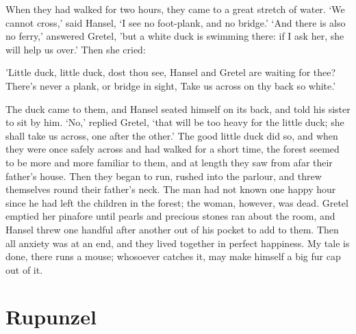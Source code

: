 \documentclass[oneside,11pt]{book} %
\begin{document}
When they had walked for two hours, they came to a great stretch of water. `We cannot cross,' said Hansel, `I see no foot-plank, and no bridge.' `And there is also no ferry,' answered Gretel, 'but a white
duck is swimming there: if I ask her, she will help us over.' Then she cried:

'Little duck, little duck, dost thou see,
Hansel and Gretel are waiting for thee?
There's never a plank, or bridge in sight,
Take us across on thy back so white.'

The duck came to them, and Hansel seated himself on its back, and told his sister to sit by him. `No,' replied Gretel, `that will be too heavy for the little duck; she shall take us across, one after the other.' The good little duck did so, and when they were once safely across and had walked for a short time, the forest seemed to be more and more familiar to them, and at length they saw from afar their father's house. Then they began to run, rushed into the parlour, and threw themselves round their father's neck. The man had not known one happy hour since he had left the children in the forest; the woman, however, was dead. Gretel emptied her pinafore until pearls and precious stones ran about the room, and Hansel threw one handful after another out of his pocket to add to them. Then all anxiety was at an end, and they lived together in perfect happiness. My tale is done, there runs a mouse; whosoever catches it, may make himself a big fur cap out of it.


\chapter{Rupunzel}
\end{document}
